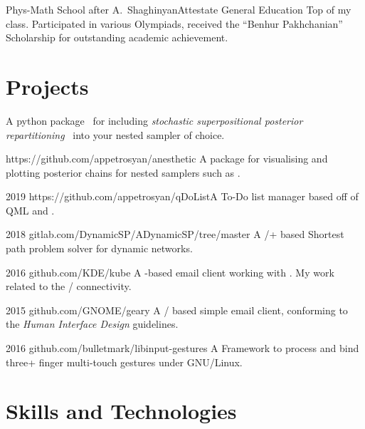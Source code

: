 \documentclass{CurriculumVitae}[10pt, draft, condensed]
\begin{document}
{ {Phys-Math School after
  A.~Shaghinyan}{Attestate }{General Education} {Top of my
  class. Participated in various Olympiads, received the ``Benhur
  Pakhchanian'' Scholarship for outstanding academic achievement. }

\section*{Projects}

{A python package~\cite{sspr-joss} for including \emph{stochastic superpositional posterior repartitioning}~\cite{sspr} into your nested sampler of choice.}

{https://github.com/appetrosyan/anesthetic}
{A package for visualising and plotting posterior chains for nested samplers such as .}

 {2019}
{https://github.com/appetrosyan/qDoList}{A To-Do
  list manager based off of QML and .}

 {2018}
{gitlab.com/DynamicSP/ADynamicSP/tree/master} {A
  /+ based Shortest path problem solver
  for dynamic networks. }

 {2016} {github.com/KDE/kube} {A -based
  email client working with . My work related to
  the / connectivity. }

 {2015} {github.com/GNOME/geary} {A
  / based simple email client, conforming to
  the  \emph{Human Interface Design} guidelines.}

 {2016}
{github.com/bulletmark/libinput-gestures} {A Framework to process and
  bind three+ finger multi-touch gestures under GNU/Linux. }



\section*{Skills and Technologies}

\begin{multicols}{4}
  

\end{multicols}}
\end{document}
